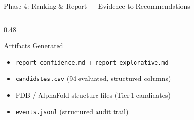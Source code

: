 \documentclass[aspectratio=169, 11pt]{beamer}
\begin{document}
\begin{frame}{Phase 4: Ranking \& Report --- Evidence to Recommendations}
\begin{columns}[T]
\begin{column}{0.48\textwidth}
\vspace{1pt}
\begin{block}{\small Artifacts Generated}
\vspace{-2pt}
\begin{itemize}\scriptsize
\setlength\itemsep{0pt}
\item \texttt{report\_confidence.md} + \texttt{report\_explorative.md}
\item \texttt{candidates.csv} (94 evaluated, structured columns)
\item PDB / AlphaFold structure files (Tier\,1 candidates)
\item \texttt{events.jsonl} (structured audit trail)
\end{itemize}
\end{block}
\end{column}
\end{columns}
\end{frame}
\end{document}
